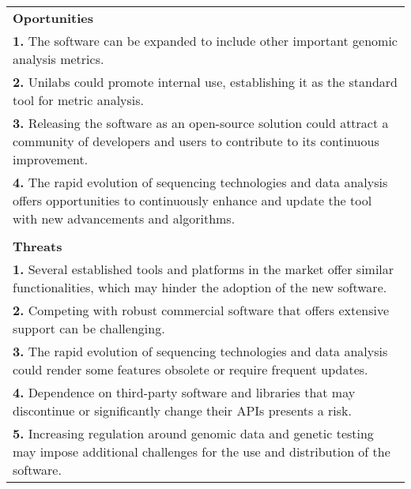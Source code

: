\begin{table}[]
\begin{tabular}{p{\textwidth}}
    \rowcolor[HTML]{5CB195} 
    \textbf{Oportunities} \\ 
    \textbf{1.} The software can be expanded to include other important genomic analysis metrics. \\
    \textbf{2.} Unilabs could promote internal use, establishing it as the standard tool for metric analysis. \\
    \textbf{3.} Releasing the software as an open-source solution could attract a community of developers and users to contribute to its continuous improvement. \\
    \textbf{4.} The rapid evolution of sequencing technologies and data analysis offers opportunities to continuously enhance and update the tool with new advancements and algorithms. \\ \\
    \rowcolor[HTML]{E7422F} 
    \textbf{Threats} \\ 
    \textbf{1.} Several established tools and platforms in the market offer similar functionalities, which may hinder the adoption of the new software. \\
    \textbf{2.} Competing with robust commercial software that offers extensive support can be challenging. \\
    \textbf{3.} The rapid evolution of sequencing technologies and data analysis could render some features obsolete or require frequent updates. \\
    \textbf{4.} Dependence on third-party software and libraries that may discontinue or significantly change their APIs presents a risk. \\
    \textbf{5.} Increasing regulation around genomic data and genetic testing may impose additional challenges for the use and distribution of the software. \\ 
    \end{tabular}
    \end{table}

    